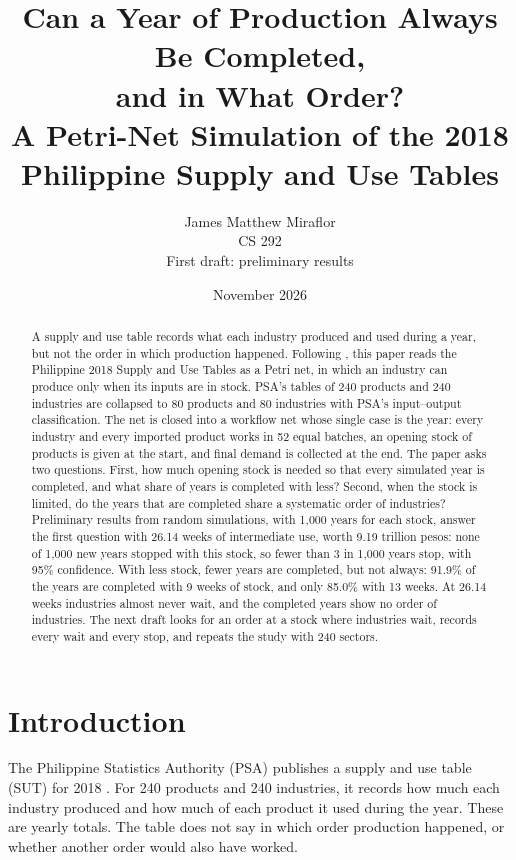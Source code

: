 \documentclass[11pt]{article}
\title{Can a Year of Production Always Be Completed,\\ and in What Order?\\[4pt] \large A Petri-Net Simulation of the 2018 Philippine Supply and Use Tables}
\author{James Matthew Miraflor\\\small CS 292\\\small First draft: preliminary results}
\date{November 2026}
\begin{document}
\maketitle

\begin{abstract}
A supply and use table records what each industry produced and used during a year, but not the order in which production happened. Following \citet{Bonanno1993,Bonanno1995}, this paper reads the Philippine 2018 Supply and Use Tables as a Petri net, in which an industry can produce only when its inputs are in stock. PSA's tables of 240 products and 240 industries are collapsed to 80 products and 80 industries with PSA's input--output classification. The net is closed into a workflow net whose single case is the year: every industry and every imported product works in 52 equal batches, an opening stock of products is given at the start, and final demand is collected at the end. The paper asks two questions. First, how much opening stock is needed so that every simulated year is completed, and what share of years is completed with less? Second, when the stock is limited, do the years that are completed share a systematic order of industries? Preliminary results from random simulations, with 1{,}000 years for each stock, answer the first question with 26.14 weeks of intermediate use, worth 9.19 trillion pesos: none of 1{,}000 new years stopped with this stock, so fewer than 3 in 1{,}000 years stop, with 95\% confidence. With less stock, fewer years are completed, but not always: 91.9\% of the years are completed with 9 weeks of stock, and only 85.0\% with 13 weeks. At 26.14 weeks industries almost never wait, and the completed years show no order of industries. The next draft looks for an order at a stock where industries wait, records every wait and every stop, and repeats the study with 240 sectors.
\end{abstract}

\section{Introduction}\label{sec:intro}

The Philippine Statistics Authority (PSA) publishes a supply and use table (SUT) for 2018 \citep{PSA2021SUT}. For 240 products and 240 industries, it records how much each industry produced and how much of each product it used during the year. These are yearly totals. The table does not say in which order production happened, or whether another order would also have worked.
\end{document}
